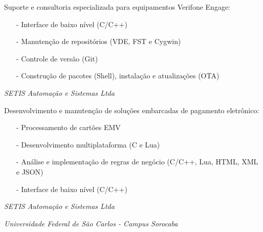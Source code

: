 \documentclass[11pt,a4paper,sans]{moderncv}
\begin{document}
\hspace{1.25cm} \begin{minipage}[htb]{\linewidth - 1.25cm}
    Suporte e consultoria especializada para equipamentos Verifone
    Engage:
    \begin{itemize}
        \item[-] Interface de baixo nível (C/C++)
        \item[-] Manutenção de repositórios (VDE, FST e Cygwin)
        \item[-] Controle de versão (Git)
        \item[-] Construção de pacotes (Shell), instalação e atualizações (OTA)
    \end{itemize}
\end{minipage}

\vspace{\baselineskip}

\hspace{1.25cm} \textit{SETIS Automação e Sistemas Ltda}


\hspace{1.25cm} \begin{minipage}[htb]{\linewidth - 1.25cm}
    Desenvolvimento e manutenção de soluções embarcadas de pagamento
    eletrônico:
    \begin{itemize}
        \item[-] Processamento de cartões EMV
        \item[-] Desenvolvimento multiplataforma (C e Lua)
        \item[-] Análise e implementação de regras de negócio (C/C++, Lua,
                 HTML, XML e JSON)
        \item[-] Interface de baixo nível (C/C++)
    \end{itemize}
\end{minipage}

\vspace{\baselineskip}

\hspace{1.25cm} \textit{SETIS Automação e Sistemas Ltda}


\vspace{\baselineskip}

\hspace{1.25cm} \textit{Universidade Federal de São Carlos - Campus Sorocaba}
\end{document}
